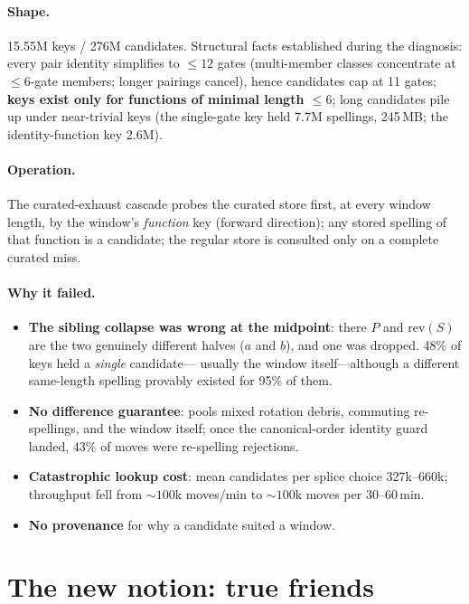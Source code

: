 \documentclass[11pt]{article}
\begin{document}
\paragraph{Shape.} 15.55M keys / 276M candidates. Structural facts
established during the diagnosis: every pair identity simplifies to $\le 12$
gates (multi-member classes concentrate at $\le 6$-gate members; longer
pairings cancel), hence candidates cap at 11 gates; \textbf{keys exist only
for functions of minimal length $\le 6$}; long candidates pile up under
near-trivial keys (the single-gate key held 7.7M spellings, 245\,MB; the
identity-function key 2.6M).

\paragraph{Operation.} The curated-exhaust cascade probes the curated store
first, at every window length, by the window's \emph{function} key (forward
direction); any stored spelling of that function is a candidate; the regular
store is consulted only on a complete curated miss.

\paragraph{Why it failed.}
\begin{itemize}
\item[F1.] \textbf{The sibling collapse was wrong at the midpoint}: there
$P$ and $\mathrm{rev}(S)$ are the two genuinely different halves ($a$ and
$b$), and one was dropped. 48\% of keys held a \emph{single} candidate---
usually the window itself---although a different same-length spelling
provably existed for 95\% of them.
\item[F2.] \textbf{No difference guarantee}: pools mixed rotation debris,
commuting re-spellings, and the window itself; once the canonical-order
identity guard landed, 43\% of moves were re-spelling rejections.
\item[F3.] \textbf{Catastrophic lookup cost}: mean candidates per splice
choice 327k--660k; throughput fell from ${\sim}100$k moves/min to
${\sim}100$k moves per 30--60\,min.
\item[F4.] \textbf{No provenance} for why a candidate suited a window.
\end{itemize}

\section{The new notion: true friends}
\end{document}
